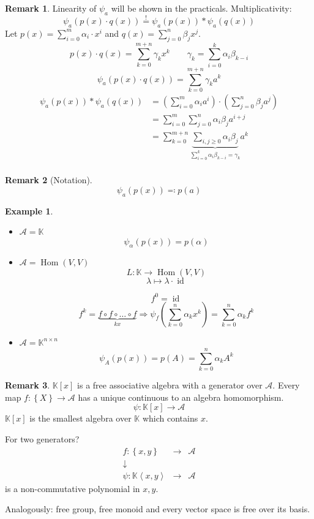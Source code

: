 \documentclass[a4paper,landscape,twocolumn]{article}
\newcommand\set[1]{\left\{#1\right\}}
\newcommand\functional[1]{\left\langle{#1}\right\rangle}
\theoremstyle{definition}
\newtheorem{ex}{Example}
\newtheorem{rem}{Remark}
\DeclareMathOperator\Hom{Hom} %
\begin{document}
\begin{rem}
  Linearity of $\psi_{a}$ will be shown in the practicals.
  Multiplicativity:
  \[ \psi_a(p(x) \cdot q(x)) \stackrel!= \psi_a(p(x)) * \psi_a(q(x)) \]
  Let $p(x) = \sum_{i=0}^m \alpha_i \cdot x^i$ and $q(x) = \sum_{j=0}^n \beta_j x^j$.
  \[ p(x) \cdot q(x) = \sum_{k=0}^{m+n} \gamma_k x^k \qquad \gamma_k = \sum_{i=0}^k \alpha_i \beta_{k-i} \]
  \[ \psi_a(p(x) \cdot q(x)) = \sum_{k=0}^{m+n} \gamma_k a^k \]
  \begin{align*}
    \psi_a(p(x)) * \psi_a(q(x)) &= \left(\sum_{i=0}^m \alpha_i a^i\right) \cdot \left(\sum_{j=0}^n \beta_j a^j\right) \\
        &= \sum_{i=0}^m \sum_{j=0}^n \alpha_i \beta_j a^{i+j} \\
        &= \sum_{k=0}^{m+n} \underbrace{\sum_{i,j \geq 0} \alpha_i \beta_j}_{\sum_{i=0}^k \alpha_i \beta_{k-i} = \gamma_k} a^k \\
  \end{align*}
\end{rem}

\begin{rem}[Notation]
  \[ \psi_a(p(x)) \eqqcolon p(a) \]
\end{rem}

\begin{ex}
  \label{ex-9.13}
  \begin{itemize}
    \item $\mathcal A = \mathbb K$
      \[ \psi_{\alpha}(p(x)) = p(\alpha) \]
    \item $\mathcal A = \Hom(V,V)$
      \[ L: \mathbb K \to \Hom(V,V) \]
      \[ \lambda \mapsto \lambda \cdot \operatorname{id} \]

      \[ f^0 = \operatorname{id} \]
      \[ f^k = \underbrace{f \circ f \circ \ldots \circ f}_{kx} \Rightarrow \psi_f\left(\sum_{k=0}^n \alpha_k x^k\right) = \sum_{k=0}^n \alpha_k f^k \]
    \item $\mathcal A = \mathbb K^{n\times n}$
      \[ \psi_A(p(x)) = p(A) = \sum_{k=0}^n \alpha_k A^k \]
  \end{itemize}
\end{ex}

\begin{rem}
  $\mathbb K[x]$ is a free associative algebra with a generator over $\mathcal A$.
  Every map $f: \set{X} \to \mathcal A$ has a unique continuous to an algebra homomorphism.
  \[ \psi: \mathbb K[x] \to \mathcal A \]
  $\mathbb K[x]$ is the smallest algebra over $\mathbb K$ which contains $x$.

  For two generators?
  \[
    \begin{array}{ccc}
      f: \set{x,y}                    & \to & \mathcal A \\
      \downarrow                      &       & \\
      \psi: \mathbb K\functional{x,y} & \to & \mathcal A
    \end{array}
  \]
  is a non-commutative polynomial in $x,y$.

  Analogously: free group, free monoid and every vector space is free over its basis.
\end{rem}
\end{document}

